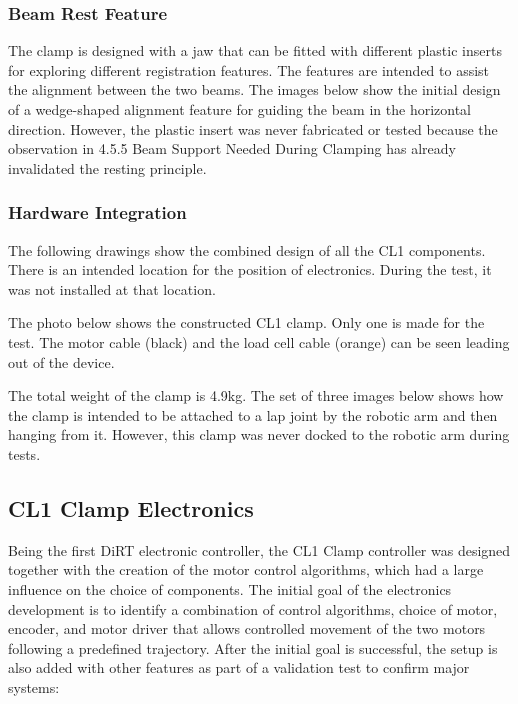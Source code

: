 \subsubsection{Beam Rest Feature}
\label{subsubsection:exploration_1_beam_rest_feature}

The clamp is designed with a jaw that can be fitted with different plastic inserts for exploring different registration features. The features are intended to assist the alignment between the two beams. The images below show the initial design of a wedge-shaped alignment feature for guiding the beam in the horizontal direction. However, the plastic insert was never fabricated or tested because the observation in 4.5.5 Beam Support Needed During Clamping has already invalidated the resting principle.

\subsubsection{Hardware Integration}
\label{subsubsection:exploration_1_hardware_integration}

The following drawings show the combined design of all the CL1 components. There is an intended location for the position of electronics. During the test, it was not installed at that location.


The photo below shows the constructed CL1 clamp. Only one is made for the test. The motor cable (black) and the load cell cable (orange) can be seen leading out of the device.

The total weight of the clamp is 4.9kg.
The set of three images below shows how the clamp is intended to be attached to a lap joint by the robotic arm and then hanging from it. However, this clamp was never docked to the robotic arm during tests.


\subsection{CL1 Clamp Electronics}
\label{subsection:exploration_1_cl1_clamp_electronics}

Being the first DiRT electronic controller, the CL1 Clamp controller was designed together with the creation of the motor control algorithms, which had a large influence on the choice of components. The initial goal of the electronics development is to identify a combination of control algorithms, choice of motor, encoder, and motor driver that allows controlled movement of the two motors following a predefined trajectory.
After the initial goal is successful, the setup is also added with other features as part of a validation test to confirm major systems:

